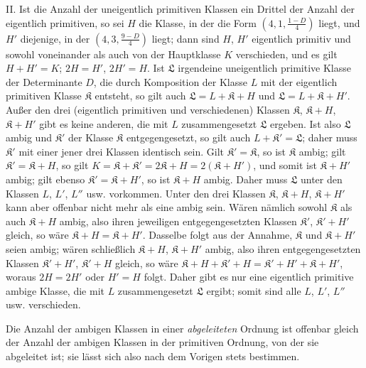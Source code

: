 II. Ist die Anzahl der uneigentlich primitiven Klassen ein Drittel der Anzahl der eigentlich primitiven, so sei $H$ die Klasse, in der die Form $\left(4,\allowbreak 1,\allowbreak \frac{1-D}{4}\right)$ liegt, und $H'$ diejenige, in der $\left(4,\allowbreak 3,\allowbreak \frac{9-D}{4}\right)$ liegt; dann sind $H$, $H'$ eigentlich primitiv und sowohl
voneinander als auch von der Hauptklasse $K$ verschieden, und es gilt $H+H'=K$; $2H=H'$, $2H'=H$. Ist $\mathfrak{L}$ irgendeine uneigentlich primitive Klasse der Determinante $D$, die durch Komposition der Klasse $L$ mit der eigentlich primitiven Klasse $\mathfrak{K}$ entsteht, so gilt auch $\mathfrak{L}=L+\mathfrak{K}+H$ und $\mathfrak{L}=L+\mathfrak{K}+H'$. Außer den drei (eigentlich primitiven und verschiedenen) Klassen $\mathfrak{K}$, $\mathfrak{K}+H$, $\mathfrak{K}+H'$ gibt es keine anderen, die mit $L$ zusammengesetzt $\mathfrak{L}$ ergeben. Ist also $\mathfrak{L}$ ambig und $\mathfrak{K}'$ der Klasse $\mathfrak{K}$ entgegengesetzt, so gilt auch $L+\mathfrak{K}'=\mathfrak{L}$; daher muss $\mathfrak{K}'$ mit einer jener drei Klassen identisch sein. Gilt $\mathfrak{K}'=\mathfrak{K}$, so ist $\mathfrak{K}$ ambig; gilt $\mathfrak{K}'=\mathfrak{K}+H$, so gilt $K=\mathfrak{K}+\mathfrak{K}'=2\mathfrak{K}+H=2(\mathfrak{K}+H')$, und somit ist $\mathfrak{K}+H'$ ambig; gilt ebenso $\mathfrak{K}'=\mathfrak{K}+H'$, so ist $\mathfrak{K}+H$ ambig. Daher muss $\mathfrak{L}$ unter den Klassen $L$, $L'$, $L''$ usw. vorkommen. Unter den drei Klassen $\mathfrak{K}$, $\mathfrak{K}+H$, $\mathfrak{K}+H'$ kann aber offenbar nicht mehr als eine ambig sein. Wären nämlich sowohl $\mathfrak{K}$ als auch $\mathfrak{K}+H$ ambig, also ihren jeweiligen entgegengesetzten Klassen $\mathfrak{K}'$, $\mathfrak{K}'+H'$ gleich, so wäre $\mathfrak{K}+H=\mathfrak{K}+H'$. Dasselbe folgt aus der Annahme, $\mathfrak{K}$ und $\mathfrak{K}+H'$ seien ambig; wären schließlich $\mathfrak{K}+H$, $\mathfrak{K}+H'$ ambig, also ihren entgegengesetzten Klassen $\mathfrak{K}'+H'$, $\mathfrak{K}'+H$ gleich, so wäre $\mathfrak{K}+H+\mathfrak{K}'+H=\mathfrak{K}'+H'+\mathfrak{K}+H'$, woraus $2H=2H'$ oder $H'=H$ folgt. Daher gibt es nur eine eigentlich primitive ambige Klasse, die mit $L$ zusammengesetzt $\mathfrak{L}$ ergibt; somit sind alle $L$, $L'$, $L''$ usw. verschieden.

Die Anzahl der ambigen Klassen in einer \textit{abgeleiteten} Ordnung ist offenbar gleich der Anzahl der ambigen Klassen in der primitiven Ordnung, von der sie abgeleitet ist; sie lässt sich also nach dem Vorigen stets bestimmen.

